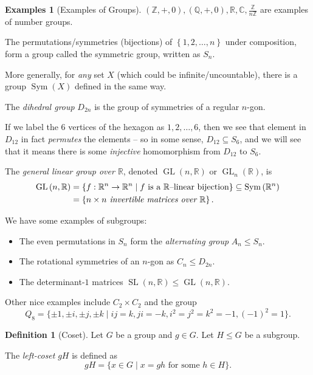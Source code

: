 \documentclass{article}
\theoremstyle{definition}
\newtheorem{definition}[theorem]{Definition}
\newtheorem{examples}[theorem]{Examples}
\theoremstyle{remark}
\newcommand{\pqty}[1]{\left(#1\right)}
\newcommand{\Bqty}[1]{\left\{#1\right\}}
\newcommand{\set}[2]{\{#1\mid #2\}}
\newcommand{\flatfrac}[2]{\frac{#1}{#2}}
\newcommand{\functiondomain}[3]{#1:#2\to #3}
\newcommand{\subgroup}{\leq}
\newcommand{\ZZ}{\mathbb{Z}}
\newcommand{\QQ}{\mathbb{Q}}
\newcommand{\RR}{\mathbb{R}}
\newcommand{\CC}{\mathbb{C}}
\newcommand{\GL}{\operatorname{GL}}
\newcommand{\SL}{\operatorname{SL}}
\newcommand{\Sym}{\operatorname{Sym}}
\begin{document}
\begin{examples}[Examples of Groups]
    \label{ex:examples-of-groups}%
    \(\pqty{\ZZ, +, 0}, \pqty{\QQ, +, 0}, \RR, \CC, \flatfrac{\ZZ}{n \ZZ}\) are examples of number groups.

    The permutations/symmetries (bijections) of \(\Bqty{1, 2, \ldots, n}\) under composition, form a group called the symmetric group, written as \(S_n\).
    
    More generally, for \emph{any} set \(X\) (which could be infinite/uncountable), there is a group \(\Sym\pqty{X}\) defined in the same way.

    The \emph{dihedral group} \(D_{2n}\) is the group of symmetries of a regular \(n\)-gon.

    If we label the \(6\) vertices of the hexagon as \(1, 2, \ldots, 6\), then we see that element in \(D_{12}\) in fact \emph{permutes} the elements -- so in some sense, \(D_{12} \subseteq S_6\), and we will see that it means there is some \emph{injective} homomorphism from \(D_{12}\) to \(S_6\).

    The \emph{general linear group over \(\RR\)}, denoted \(\GL\pqty{n, \RR}\) or \(\GL_n\pqty{\RR}\), is
    \begin{align*}
        \GL\pqty{n, \RR} &= \set{\functiondomain{f}{\RR^n}{\RR^n}}{f \text{ is a }\RR\text{--linear bijection}} \subseteq \Sym\pqty{\RR^n} \\
        &= \Bqty{n \times n \emph{ invertible matrices over }\RR}.
    \end{align*}

    We have some examples of subgroups:
    \begin{itemize}
        \item The even permutations in \(S_n\) form the \emph{alternating group} \(A_n \subgroup S_n\).
        \item The rotational symmetries of an \(n\)-gon as \(C_n \subgroup D_{2n}\).
        \item The determinant-\(1\) matrices \(\SL\pqty{n, \RR} \subgroup \GL\pqty{n, \RR}\).
    \end{itemize}

    Other nice examples include \(C_2 \times C_2\) and the group
    \[
        Q_8 = \set{\pm 1, \pm i, \pm j, \pm k}{ij = k, ji = -k, i^2 = j^2 = k^2 = -1, \pqty{-1}^2 = 1}.
    \]
\end{examples}

\begin{definition}[Coset]
    \label{def:coset}%
    Let \(G\) be a group and  \(g \in G\). Let \(H \subgroup G\) be a subgroup.
    
    The \emph{left-coset} \(gH\) is defined as
    \[
        gH = \set{x \in G}{x = gh \text{ for some } h \in H}.
    \]
\end{definition}
\end{document}

